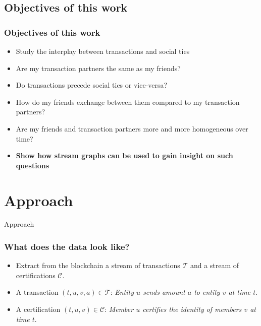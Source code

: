 \documentclass{beamer}
\begin{document}
\begin{frame}
\begin{columns}[c]
{\begin{figure}
				\end{figure}}
		\end{columns}
\end{frame}


\subsection{Objectives of this work}

\begin{frame}
	\frametitle{Objectives of this work}
	\begin{itemize}
		\item<1-> Study the interplay between transactions and social ties
		\item<2-> Are my transaction partners the same
as my friends?
		\item<3-> Do transactions precede social ties or vice-versa?
		\item<4-> How do my friends exchange between them compared to my transaction partners?
		\item<5-> Are my friends and transaction partners more and more homogeneous over time?
		\item<6-> \textbf{Show how stream graphs can be used to gain insight on such questions}	 
	\end{itemize}
\end{frame}



\section{Approach}

\begin{frame}
	\Huge{\centerline{Approach}}
\end{frame}


\begin{frame}
	\frametitle{What does the \textbf{data} look like?}
	\begin{itemize}
		\item<1-> Extract from the blockchain a stream of transactions $\mathcal{T}$ and a stream of certifications $\mathcal{C}$.
		\item<2-> A transaction $\left(t,u,v,a\right) \in \mathcal{T}$: \textit{Entity $u$ sends amount $a$ to entity $v$ at time $t$}.
		\item<3-> A certification $\left(t,u,v\right) \in \mathcal{C}$: \textit{Member $u$ certifies the identity of members $v$ at time $t$}.
	\end{itemize}
\end{frame}
\end{document}
